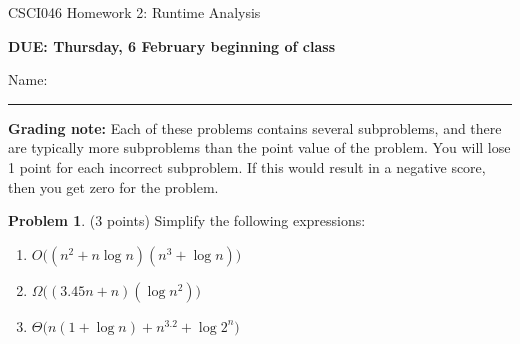 \documentclass[10pt]{article}
\theoremstyle{definition}
\newtheorem{problem}{Problem}
\begin{document}
\begin{center}
    {
\Large
CSCI046 Homework 2: Runtime Analysis
}


    \vspace{0.1in}
    \textbf{DUE: Thursday, 6 February beginning of class}

    \vspace{0.1in}
\end{center}

\vspace{0.25in}
\noindent
Name: 

\noindent
\rule{\textwidth}{0.1pt}
\vspace{0.15in}

\noindent
\textbf{Grading note:} 
Each of these problems contains several subproblems,
and there are typically more subproblems than the point value of the problem.
You will lose 1 point for each incorrect subproblem.
If this would result in a negative score, then you get zero for the problem.
\vspace{0.15in}


\begin{problem}
    (3 points)
    Simplify the following expressions:

\begin{enumerate}
    \item $O\bigg((n^2 + n\log n)(n^3 + \log n)\bigg)$
    \vspace{1.5in}
\item $\Omega\bigg((3.45n + n)(\log n^2)\bigg)$
    \vspace{1.5in}
\item $\Theta\bigg(n(1 + \log n) + n^{3.2} + \log 2^n\bigg)$
\end{enumerate}
\end{problem}
\end{document}
